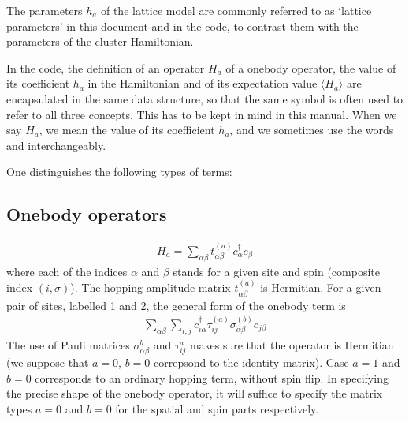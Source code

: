 \documentclass[letterpaper,10pt,english]{sphinxmanual}
\begin{document}
\sphinxAtStartPar
The parameters \(h_a\) of the lattice model are commonly referred to as ‘lattice parameters’ in this document and in the code, to contrast them with the parameters of the cluster Hamiltonian.

\sphinxAtStartPar
In the code, the definition of an operator \(H_a\) of a one\sphinxhyphen{}body operator, the value of its coefficient \(h_a\) in the Hamiltonian and of its expectation value \(\langle H_a\rangle\) are encapsulated in the same data structure, so that the same symbol is often used to refer to all three concepts. This has to be kept in mind in this manual. When we say  \(H_a\), we mean the value of its coefficient \(h_a\), and we sometimes use the words  and  interchangeably.

\sphinxAtStartPar
One distinguishes the following types of terms:


\subsection{One\sphinxhyphen{}body operators}
\label{\detokenize{models:one-body-operators}}\begin{equation*}
\begin{split}H_a = \sum_{\alpha\beta} t^{(a)}_{\alpha\beta} c^\dagger_\alpha c_\beta\end{split}
\end{equation*}
\sphinxAtStartPar
where each of the indices \(\alpha\) and \(\beta\) stands for a given site and spin (composite index \((i,\sigma)\)).
The hopping amplitude matrix \(t^{(a)}_{\alpha\beta}\) is Hermitian.
For a given pair of sites, labelled 1 and 2, the general form of the one\sphinxhyphen{}body term is
\begin{equation*}
\begin{split}\sum_{\alpha\beta}\sum_{i,j} c^\dagger_{i\alpha} \tau^{(a)}_{ij} \sigma^{(b)}_{\alpha\beta}  c_{j\beta}\end{split}
\end{equation*}
\sphinxAtStartPar
The use of Pauli matrices \(\sigma^b_{\alpha\beta}\) and \(\tau^a_{ij}\) makes sure that the operator is Hermitian (we suppose that \(a=0\), \(b=0\) correpsond to the identity matrix). Case \(a=1\) and \(b=0\) corresponds to an ordinary hopping term, without spin flip. In specifying the precise shape of the one\sphinxhyphen{}body operator, it will suffice to specify the matrix types \(a=0\) and \(b=0\) for the spatial and spin parts respectively.
\end{document}
